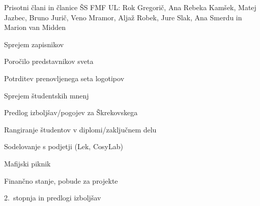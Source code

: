 \documentclass{seja}
\begin{document}
Prisotni člani in članice ŠS FMF UL: Rok Gregorič,  Ana Rebeka Kamšek, Matej Jazbec, Bruno Jurič,
Veno Mramor, Aljaž Robek, Jure Slak, Ana Smerdu in Marion van Midden

\begin{red*}
\item Sprejem zapisnikov
\item Poročilo predstavnikov sveta
\item Potrditev prenovljenega seta logotipov
\item Sprejem študentskih mnenj
\item Predlog izboljšav/pogojev za Škrekovskega
\item Rangiranje študentov v diplomi/zaključnem delu
\item Sodelovanje s podjetji (Lek, CosyLab)
\item Mafijski piknik
\item Finančno stanje, pobude za projekte
\item 2.\ stopnja in predlogi izboljšav
\end{red*}
\end{document}
